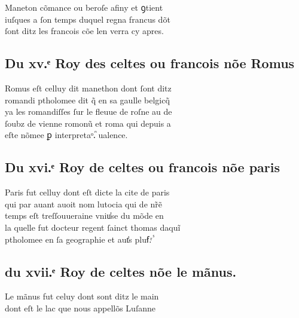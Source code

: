 \documentclass[12pt]{article}
\begin{document}
Maneton cõmance ou beroſe afiny et ꝯtient\\
iuſques a ſon temps duquel regna francus
            dõt\\
ſont ditz les francois cõe len verra cy apres.





\subsection*{Du xv.ͤ Roy des celtes ou francois nõe Romus}


Romus eſt celluy dit manethon dont ſont ditz\\
romandi ptholomee dit q̃ en sa gaulle belgicq̃\\
ya les
          romandiſſes ſur le fleuue de roſne au de\\
ſoubz de vienne romonũ et roma qui
          depuis a\\
eſte nõmee ꝑ interpretaᵒ.ᷠ ualence.







\newpage






\subsection*{Du xvi.ͤ Roy de celtes ou francois nõe paris}


Paris fut celluy dont eſt dicte la cite de
            paris\\
qui par auant auoit nom lutocia qui de nr̃ẽ\\
temps eſt
          treſſouueraine vniu̾se du mõde en\\
la quelle fut docteur regent ſainct thomas daquĩ\\
ptholomee en ſa geographie et aut̾s pluẜ.ͬ ᷤ





\subsection*{du xvii.ͤ Roy de celtes nõe le
            mãnus.}


Le mãnus fut celuy dont sont ditz le
            main\\
dont eſt le lac que nous appellõs Luſanne
\end{document}
